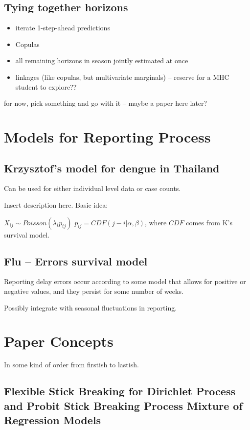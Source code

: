 \documentclass{article}
\begin{document}
\subsection{Tying together horizons}

\begin{itemize}
\item iterate 1-step-ahead predictions
\item Copulas
\item all remaining horizons in season jointly estimated at once
\item linkages (like copulas, but multivariate marginals) -- reserve for a MHC student to explore??
\end{itemize}

for now, pick something and go with it -- maybe a paper here later?

\section{Models for Reporting Process}

\subsection{Krzysztof's model for dengue in Thailand}

Can be used for either individual level data or case counts.

Insert description here.  Basic idea:

$X_{ij} \sim Poisson(\lambda_i p_{ij})$
$p_{ij} = CDF(j - i | \alpha, \beta)$, where $CDF$ comes from K's survival model.

\subsection{Flu -- Errors survival model}

Reporting delay errors occur according to some model that allows for positive or negative values, and they persist for some number of weeks.

Possibly integrate with seasonal fluctuations in reporting.


\section{Paper Concepts}

In some kind of order from firstish to lastish.

\subsection{Flexible Stick Breaking for Dirichlet Process and Probit Stick Breaking Process Mixture of Regression Models}
\end{document}
